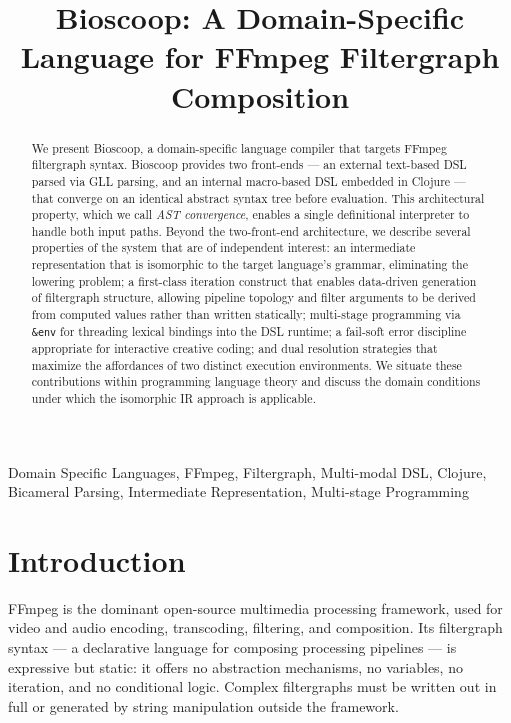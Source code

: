 \documentclass[conference]{IEEEtran}
\begin{document}
\title{Bioscoop: A Domain-Specific Language for FFmpeg Filtergraph Composition}

\author{
}

\maketitle

\begin{abstract}
We present Bioscoop, a domain-specific language compiler that targets FFmpeg filtergraph syntax. Bioscoop provides two front-ends --- an external text-based DSL parsed via GLL parsing, and an internal macro-based DSL embedded in Clojure --- that converge on an identical abstract syntax tree before evaluation. This architectural property, which we call \emph{AST convergence}, enables a single definitional interpreter to handle both input paths. Beyond the two-front-end architecture, we describe several properties of the system that are of independent interest: an intermediate representation that is isomorphic to the target language's grammar, eliminating the lowering problem; a first-class iteration construct that enables data-driven generation of filtergraph structure, allowing pipeline topology and filter arguments to be derived from computed values rather than written statically; multi-stage programming via \texttt{\&env} for threading lexical bindings into the DSL runtime; a fail-soft error discipline appropriate for interactive creative coding; and dual resolution strategies that maximize the affordances of two distinct execution environments. We situate these contributions within programming language theory and discuss the domain conditions under which the isomorphic IR approach is applicable.
\end{abstract}

\begin{IEEEkeywords}
Domain Specific Languages, FFmpeg, Filtergraph, Multi-modal DSL, Clojure, Bicameral Parsing, Intermediate Representation, Multi-stage Programming
\end{IEEEkeywords}

\section{Introduction}

FFmpeg is the dominant open-source multimedia processing framework, used for video and audio encoding, transcoding, filtering, and composition. Its filtergraph syntax --- a declarative language for composing processing pipelines --- is expressive but static: it offers no abstraction mechanisms, no variables, no iteration, and no conditional logic. Complex filtergraphs must be written out in full or generated by string manipulation outside the framework.
\end{document}
